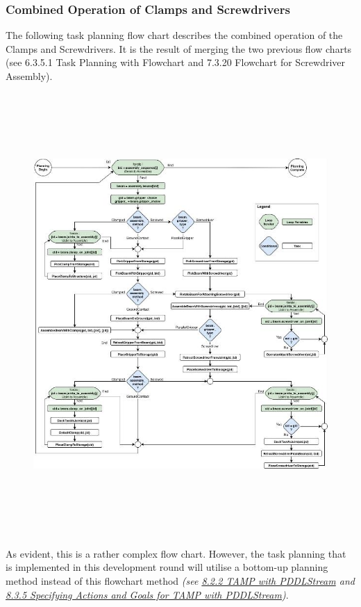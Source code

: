 \documentclass[11pt]{book}
\begin{document}
\subsubsection{Combined Operation of Clamps and Screwdrivers}

The following task planning flow chart describes the combined operation of the Clamps and Screwdrivers. It is the result of merging the two previous flow charts (see 6.3.5.1 Task Planning with Flowchart and 7.3.20 Flowchart for Screwdriver Assembly).

\begin{figure}[H]
\includegraphics[width=15.92cm,height=16.79cm]{./images/image1.jpeg}
\end{figure}


As evident, this is a rather complex flow chart. However, the task planning that is implemented in this development round will utilise a bottom-up planning method instead of this flowchart method \textit{(see \uline{8.2.2 TAMP with PDDLStream} and \uline{8.3.5 Specifying Actions and Goals for TAMP with PDDLStream})}.
\end{document}
